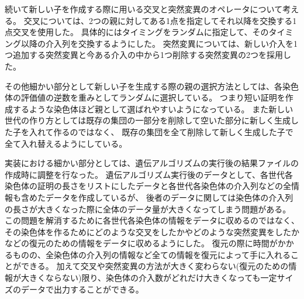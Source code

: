 続いて新しい子を作成する際に用いる交叉と突然変異のオペレータについて考える。
交叉については、2つの親に対してある1点を指定してそれ以降を交換する1点交叉を使用した。
具体的にはタイミングをランダムに指定して、そのタイミング以降の介入列を交換するようにした。
突然変異については、新しい介入を1つ追加する突然変異と今ある介入の中から1つ削除する突然変異の2つを採用した。

その他細かい部分として新しい子を生成する際の親の選択方法としては、各染色体の評価値の逆数を重みとしてランダムに選択している。
つまり短い証明を作成するような染色体ほど親として選ばれやすいようになっている。
また新しい世代の作り方としては既存の集団の一部分を削除して空いた部分に新しく生成した子を入れて作るのではなく、
既存の集団を全て削除して新しく生成した子で全て入れ替えるようにしている。

実装における細かい部分としては、遺伝アルゴリズムの実行後の結果ファイルの作成時に調整を行なった。
遺伝アルゴリズム実行後のデータとして、各世代各染色体の証明の長さをリストにしたデータと各世代各染色体の介入列などの全情報も含めたデータを作成しているが、
後者のデータに関しては染色体の介入列の長さが大きくなった際に全体のデータ量が大きくなってしまう問題がある。
この問題を解消するために各世代各染色体の情報をデータに収めるのではなく、その染色体を作るためにどのような交叉をしたかやどのような突然変異をしたかなどの復元のための情報をデータに収めるようにした。
復元の際に時間がかかるものの、全染色体の介入列の情報など全ての情報を復元によって手に入れることができる。
加えて交叉や突然変異の方法が大きく変わらない(復元のための情報が大きくならない)限り、染色体の介入数がどれだけ大きくなっても一定サイズのデータで出力することができる。